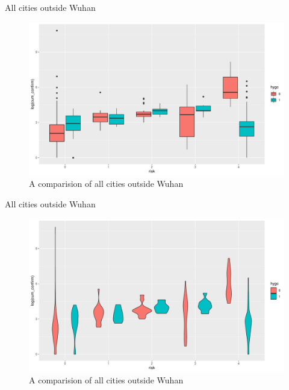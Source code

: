 \documentclass[10pt,ignorenonframetext,aspectratio=169,notes=hide,]{beamer}
\begin{document}
\begin{frame}{All cities outside Wuhan}
\protect\hypertarget{all-cities-outside-wuhan}{}

\begin{figure}
\includegraphics[width=1\linewidth]{slides_files/figure-beamer/fig4-1} \caption{A comparision of all cities outside Wuhan}\label{fig:fig4}
\end{figure}

\end{frame}

\begin{frame}{All cities outside Wuhan}
\protect\hypertarget{all-cities-outside-wuhan-1}{}

\begin{figure}
\includegraphics[width=1\linewidth]{slides_files/figure-beamer/fig5-1} \caption{A comparision of all cities outside Wuhan}\label{fig:fig5}
\end{figure}

\end{frame}
\end{document}
